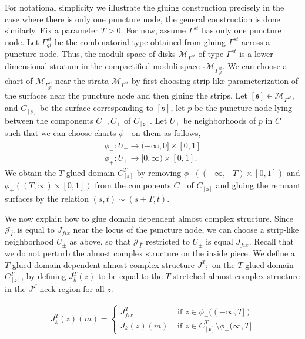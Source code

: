 \documentclass[11pt, oneside,dvipsnames]{amsart}
\renewcommand{\to}{\rightarrow}
\newcommand{\interval}{[0,1]}
\renewcommand{\to}{\rightarrow}
\newcommand{\<}{\langle}
\renewcommand{\>}{\rangle}
\newcommand{\ol}{\overline{}}
\newcommand{\M}{\mathcal{M}}
\newcommand{\J}{\mathcal{J}}
\newcommand{\sm}{\ensuremath{\setminus}}
\renewcommand{\to}{\rightarrow}
\theoremstyle{definition}
\theoremstyle{definition}
\numberwithin{equation}{subsection}
\begin{document}
For notational simplicity we illustrate the gluing construction precisely in the case where there is only one puncture node, the general construction is done similarly. Fix a parameter $T>0$. For now, assume $\Gamma^{st}$ has only one puncture node. Let $\Gamma^{st}_{gl}$ be the combinatorial type obtained from gluing $\Gamma^{st}$ across a puncture node. Thus, the moduli space of disks $\M_{\Gamma^{st}}$ of type $\Gamma^{st}$ is a lower dimensional stratum in the compactified moduli space $\ol \M_{\Gamma^{st}_{gl}}$. We can choose a chart of $\M_{\Gamma^{st}_{gl}}$ near the strata $\M_{\Gamma^{st}}$ by first choosing strip-like parameterization of the surfaces near the puncture node and then gluing the strips.  Let $[\mathfrak{s}]\in \M_{\Gamma^{st}}$, and $C_{[\mathfrak{s}]}$ be the surface corresponding to $[\mathfrak{s}]$, let $p$ be the puncture node lying between the components $C_-,C_+$ of $C_{[\mathfrak{s}]}$. Let $U_\pm$ be  neighborhoods of $p$ in $C_\pm$ such that we can choose charts  $\phi_\pm$ on them as follows,
\begin{align*}
    \phi_-:U_- \to (-\infty ,0] \times \interval \\
    \phi_+:U_+ \to [0,\infty) \times \interval.
\end{align*}
\noindent We obtain the $T$-glued domain $C^T_{[\mathfrak{s}]}$ by removing $\phi_-((-\infty,-T)\times \interval)$  and $\phi_+((T,\infty)\times \interval) $ from the components $C_\pm$ of $C_{[\mathfrak{s}]}$ and gluing the remnant surfaces by the relation $(s,t) \sim (s+T,t)$.

We now explain how to glue domain dependent almost complex structure. Since $\J_{\overline{\Gamma}}$ is equal to $J_{fix}$ near the locus of the puncture node, we can choose a strip-like neighborhood $U_\pm$ as above, so that $\J_{\overline{\Gamma}}$ restricted to $U_\pm$ is equal $J_{fix}$. Recall that we do not perturb the almost complex structure on the inside piece. We define a $T$-glued domain dependent almost complex structure $J^T;$ on the $T$-glued domain $C^T_{[\mathfrak{s}]}$, by defining $J^T_k(z)$ to be equal to the $T$-stretched almost complex structure in the $J^T$ neck region for all $z$.

\begin{align*}
    J^T_k(z) (m) =
    \begin{cases}
     J^T_{fix}        & \text{ if } z \in \phi_-((-\infty,T])\\
     J_k(z)(m)    & \text { if } z\in C^T_{[\mathfrak{s}]} \sm \phi_-(\infty,T]
     \end{cases}
\end{align*}
\end{document}
